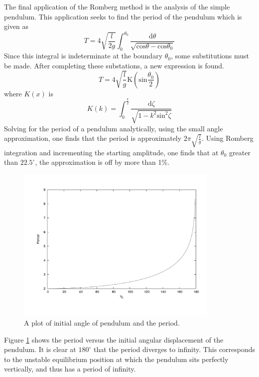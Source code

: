 \documentclass[12pt]{article}
\begin{document}
The final application of the Romberg method is the analysis of the simple pendulum.  This application seeks to find the period of the pendulum which is given as
\begin{equation}
\label{period}
T = 4\sqrt{\frac{l}{2g}} \int_0^{\theta_0} \frac{\mathrm{d}\theta}{\sqrt{\mathrm{cos} \theta - \mathrm{cos} \theta_0}}
\end{equation}
Since this integral is indeterminate at the boundary $\theta_0$, some substitutions must be made.  After completing these substations, a new expression is found.
\begin{equation}
\label{periodK}
T = 4\sqrt{\frac{l}{g}} \mathrm{K}(\mathrm{sin}\frac{\theta_0}{2})
\end{equation}
where $K(x)$ is
\begin{equation}
\label{K}
K(k) = \int_0^{\frac{\pi}{2}} \frac{\mathrm{d}\zeta}{\sqrt{1-k^2\mathrm{sin}^2\zeta}}
\end{equation}
Solving for the period of a pendulum analytically, using the small angle approximation, one finds that the period is approximately $2\pi\sqrt{\frac{l}{g}}$.  Using Romberg integration and incrementing the starting amplitude, one finds that at $\theta_0$ greater than $22.5^\circ$, the approximation is off by more than 1\%.
\begin{figure}[!h]
\centering
\includegraphics[width =120 mm, height = 75mm]{Ex_4_6.pdf}
\caption{A plot of initial angle of pendulum and the period.}
\label{fig:46}
\end{figure}
Figure \ref{fig:46} shows the period versus the initial angular displacement of the pendulum.  It is clear at $180^\circ$ that the period diverges to infinity.  This corresponds to the unstable equilibrium position at which the pendulum sits perfectly vertically, and thus has a period of infinity.
\end{document}

